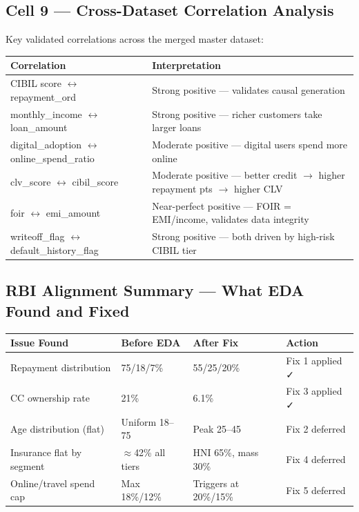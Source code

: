 \documentclass[12pt,a4paper]{article}
\begin{document}
\subsection{Cell 9 — Cross-Dataset Correlation Analysis}

Key validated correlations across the merged master dataset:

\begin{tabular}{ll}
\toprule
\textbf{Correlation} & \textbf{Interpretation} \\
\midrule
CIBIL score $\leftrightarrow$ repayment\_ord   & Strong positive — validates causal generation \\
monthly\_income $\leftrightarrow$ loan\_amount & Strong positive — richer customers take larger loans \\
digital\_adoption $\leftrightarrow$ online\_spend\_ratio & Moderate positive — digital users spend more online \\
clv\_score $\leftrightarrow$ cibil\_score      & Moderate positive — better credit $\rightarrow$ higher repayment pts $\rightarrow$ higher CLV \\
foir $\leftrightarrow$ emi\_amount             & Near-perfect positive — FOIR = EMI/income, validates data integrity \\
writeoff\_flag $\leftrightarrow$ default\_history\_flag & Strong positive — both driven by high-risk CIBIL tier \\
\bottomrule
\end{tabular}

\subsection{RBI Alignment Summary — What EDA Found and Fixed}

\begin{tabular}{p{4.5cm}p{2.5cm}p{2.5cm}p{4cm}}
\toprule
\textbf{Issue Found} & \textbf{Before EDA} & \textbf{After Fix} & \textbf{Action} \\
\midrule
Repayment distribution & 75/18/7\% & 55/25/20\% & Fix 1 applied ✓ \\
CC ownership rate & 21\% & 6.1\% & Fix 3 applied ✓ \\
Age distribution (flat) & Uniform 18--75 & Peak 25--45 & Fix 2 deferred \\
Insurance flat by segment & $\approx$42\% all tiers & HNI 65\%, mass 30\% & Fix 4 deferred \\
Online/travel spend cap & Max 18\%/12\% & Triggers at 20\%/15\% & Fix 5 deferred \\
\bottomrule
\end{tabular}
\end{document}
